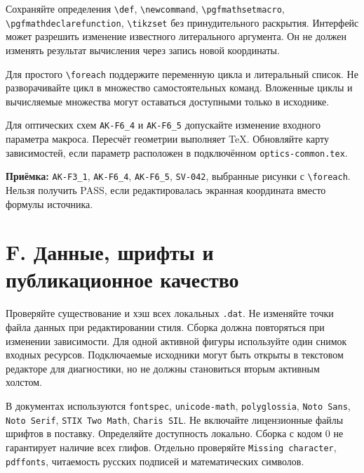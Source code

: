\documentclass[11pt,a4paper,oneside]{scrreprt}
\begin{document}
Сохраняйте определения \texttt{\textbackslash{}def}, \texttt{\textbackslash{}newcommand}, \texttt{\textbackslash{}pgfmathsetmacro}, \texttt{\textbackslash{}pgfmathdeclarefunction}, \texttt{\textbackslash{}tikzset} без принудительного раскрытия. Интерфейс может разрешить изменение известного литерального аргумента. Он не должен изменять результат вычисления через запись новой координаты.

Для простого \texttt{\textbackslash{}foreach} поддержите переменную цикла и литеральный список. Не разворачивайте цикл в множество самостоятельных команд. Вложенные циклы и вычисляемые множества могут оставаться доступными только в исходнике.

Для оптических схем \texttt{AK-F6\_4} и \texttt{AK-F6\_5} допускайте изменение входного параметра макроса. Пересчёт геометрии выполняет TeX. Обновляйте карту зависимостей, если параметр расположен в подключённом \texttt{optics-common.tex}.

\textbf{Приёмка:} \texttt{AK-F3\_1}, \texttt{AK-F6\_4}, \texttt{AK-F6\_5}, \texttt{SV-042}, выбранные рисунки с \texttt{\textbackslash{}foreach}. Нельзя получить PASS, если редактировалась экранная координата вместо формулы источника.

\section{F. Данные, шрифты и публикационное качество}\label{f.-ux434ux430ux43dux43dux44bux435-ux448ux440ux438ux444ux442ux44b-ux438-ux43fux443ux431ux43bux438ux43aux430ux446ux438ux43eux43dux43dux43eux435-ux43aux430ux447ux435ux441ux442ux432ux43e}

Проверяйте существование и хэш всех локальных \texttt{.dat}. Не изменяйте точки файла данных при редактировании стиля. Сборка должна повторяться при изменении зависимости. Для одной активной фигуры используйте один снимок входных ресурсов. Подключаемые исходники могут быть открыты в текстовом редакторе для диагностики, но не должны становиться вторым активным холстом.

В документах используются \texttt{fontspec}, \texttt{unicode-math}, \texttt{polyglossia}, \texttt{Noto\ Sans}, \texttt{Noto\ Serif}, \texttt{STIX\ Two\ Math}, \texttt{Charis\ SIL}. Не включайте лицензионные файлы шрифтов в поставку. Определяйте доступность локально. Сборка с кодом 0 не гарантирует наличие всех глифов. Отдельно проверяйте \texttt{Missing\ character}, \texttt{pdffonts}, читаемость русских подписей и математических символов.
\end{document}
